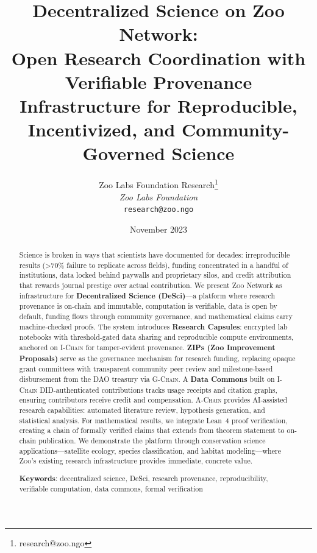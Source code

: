 \documentclass[11pt,letterpaper]{article}
\title{\textbf{Decentralized Science on Zoo Network:\\Open Research Coordination with Verifiable Provenance}\\
\large Infrastructure for Reproducible, Incentivized, and Community-Governed Science}
\author{
Zoo Labs Foundation Research\thanks{research@zoo.ngo}\\
\textit{Zoo Labs Foundation}\\
\texttt{research@zoo.ngo}
}
\date{November 2023}
\theoremstyle{definition}
\theoremstyle{remark}
\newcommand{\Zoo}{\textsc{Zoo}}
\newcommand{\AChain}{\textsc{A-Chain}}
\newcommand{\IChain}{\textsc{I-Chain}}
\newcommand{\GChain}{\textsc{G-Chain}}
\newcommand{\DID}{\textsc{DID}}
\newcommand{\DAO}{\textsc{DAO}}
\begin{document}
\zoocoverpage

\begin{abstract}
Science is broken in ways that scientists have documented for decades: irreproducible results (\textgreater 70\% failure to replicate across fields), funding concentrated in a handful of institutions, data locked behind paywalls and proprietary silos, and credit attribution that rewards journal prestige over actual contribution. We present \Zoo{} Network as infrastructure for \textbf{Decentralized Science (DeSci)}---a platform where research provenance is on-chain and immutable, computation is verifiable, data is open by default, funding flows through community governance, and mathematical claims carry machine-checked proofs. The system introduces \textbf{Research Capsules}: encrypted lab notebooks with threshold-gated data sharing and reproducible compute environments, anchored on \IChain{} for tamper-evident provenance. \textbf{ZIPs (Zoo Improvement Proposals)} serve as the governance mechanism for research funding, replacing opaque grant committees with transparent community peer review and milestone-based disbursement from the \DAO{} treasury via \GChain{}. A \textbf{Data Commons} built on \IChain{} \DID{}-authenticated contributions tracks usage receipts and citation graphs, ensuring contributors receive credit and compensation. \AChain{} provides AI-assisted research capabilities: automated literature review, hypothesis generation, and statistical analysis. For mathematical results, we integrate Lean~4 proof verification, creating a chain of formally verified claims that extends from theorem statement to on-chain publication. We demonstrate the platform through conservation science applications---satellite ecology, species classification, and habitat modeling---where \Zoo{}'s existing research infrastructure provides immediate, concrete value.

\textbf{Keywords}: decentralized science, DeSci, research provenance, reproducibility, verifiable computation, data commons, formal verification
\end{abstract}

\tableofcontents
\newpage












\end{document}
